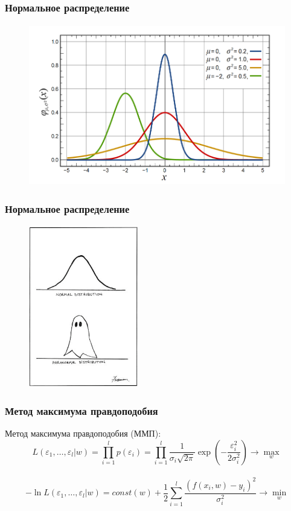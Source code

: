 \documentclass[12pt, aspectratio=169]{beamer}
\begin{document}
\begin{frame}\frametitle{Нормальное распределение}
\begin{figure}[htbp]
  \includegraphics[height=200pt, keepaspectratio = true]{images/gauss}   
\end{figure}
\end{frame}

\begin{frame}\frametitle{Нормальное распределение}
\begin{figure}[htbp]
  \includegraphics[height=200pt, keepaspectratio = true]{images/paranormal}   
\end{figure}
\end{frame}


\begin{frame}\frametitle{Метод максимума правдоподобия}
Метод максимума правдоподобия (ММП):\\
$$L(\varepsilon_1, \dots, \varepsilon_l | w) = \prod\limits_{i=1}^l p(\varepsilon_i) = \prod\limits_{i=1}^l \frac{1}{\sigma_i \sqrt{2\pi}} \exp (-\frac{\varepsilon_i^2}{2\sigma_i^2}  ) \rightarrow \max\limits_{w}$$\\
$$- \ln L(\varepsilon_1, \dots, \varepsilon_l| w) = const(w) + \frac{1}{2} \sum\limits_{i=1}^l \frac{(f(x_i, w) - y_i)^2}{\sigma_i^2}  \rightarrow \min\limits_{w}$$\\
\end{frame}
\end{document}
